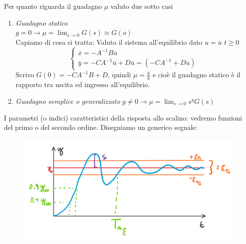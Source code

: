 	Per quanto riguarda il guadagno $ \mu $ valuto due sotto casi
	\begin{enumerate}
		\item \emph{Guadagno statico}\\$ g=0 \to \mu = \lim_{s\to0}G(s) \approx G(o)$
		\\Capiamo di cosa si tratta:
		\twomini{\[\begin{cases}
				\dot{x} = Ax+Bu\\
				y = Cx+Du
			\end{cases}\]}{\[G(s)=C(sI-A)^-1B+D\]}
		Valuto il sistema all'equilibrio dato $ u = \overline{u}\,\, t\geq0 $
		\begin{equation*}
			\begin{cases}
				\overline{x} = -A^{-1} B\overline{u}\\
				\overline{y} = -CA^{-1}\overline{u} + D\overline{u} =\left( -CA^{-1} + D\overline{u}\right)
			\end{cases}
		\end{equation*}
		Scrivo $ G(0) = -CA^{-1}B + D $, quindi $ \mu = \frac{\overline{y}}{\overline{u}} $ e cioè il guadagno statico è il rapporto tra uscita ed ingresso all'equilibrio.
		\item \emph{Guadagno semplice o generalizzato} $ g\neq 0 \to \mu = \lim_{s\to0} s^gG(s)$
	\end{enumerate}
	I parametri (o indici) caratteristici della risposta allo scalino: vedremo funzioni del primo o del secondo ordine.
	Disegniamo un generico segnale:
	\begin{figure}[H]
		\centering
		\includegraphics[width=0.7\linewidth]{Images/generico_segnale}
	\end{figure}

